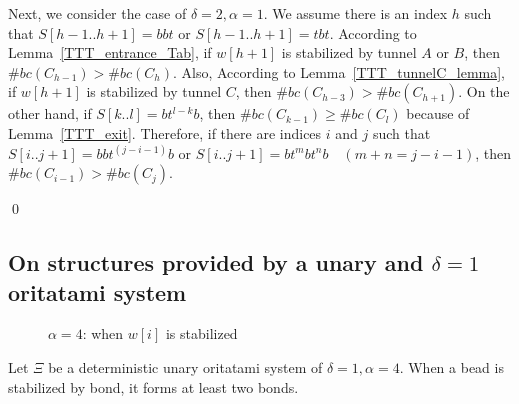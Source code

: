 Next, we consider the case of $\delta = 2, \alpha = 1$. We assume there is an index $h$ such that $S[h-1..h+1] = bbt$ or $S[h-1..h+1] = tbt$. According to Lemma~\ref{TTT_entrance_Tab}, if $w[h+1]$ is stabilized by tunnel $A$ or $B$, then $\#bc(C_{h-1}) > \#bc(C_{h})$. Also,  According to Lemma~\ref{TTT_tunnelC_lemma}, if $w[h+1]$ is stabilized by tunnel $C$, then $\#bc(C_{h-3}) > \#bc(C_{h+1})$.
On the other hand, if $S[k..l] = bt^{l-k}b$, then $\#bc(C_{k-1}) \geq \#bc(C_{l})$ because of Lemma~\ref{TTT_exit}. Therefore, if there are indices $i$ and $j$ such that $S[i..j+1] = bbt^{(j-i-1)}b$ or $S[i..j+1] = bt^mbt^nb \quad (m + n = j-i-1)$, then $\#bc(C_{i-1}) > \#bc(C_{j})$.

\qed








\subsection{On structures provided by a unary and $\delta = 1$ oritatami system}

\begin{figure}[tb]
 \centering
    \caption{$\alpha = 4$: when $w[i]$ is stabilized}
    \label{TTT_a4_lemma_fig}
\end{figure}

\begin{lemma}
\label{TTT_a4_2b_lemma}
Let $\Xi$ be a deterministic unary oritatami system of $\delta = 1, \alpha = 4$.
When a bead is stabilized by bond, it forms at least two bonds.
\end{lemma}

